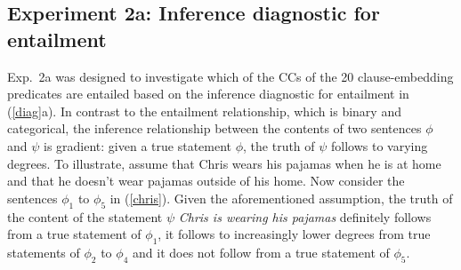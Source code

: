 \documentclass[11pt,fleqn]{article}
\newcommand{\6}{\mbox{$[\hspace*{-.6mm}[$}}
\newcommand{\9}{\mbox{$]\hspace*{-.6mm}]$}}
\begin{document}
%
%
%
%

\subsection{Experiment 2a: Inference diagnostic for entailment}\label{s31}

Exp.~2a was designed to investigate which of the CCs of the 20 clause-embedding predicates are entailed based on the inference diagnostic for entailment in (\ref{diag}a). In contrast to the entailment relationship, which is binary and categorical, the inference relationship between the contents of two sentences $\phi$ and $\psi$ is gradient: given a true statement $\phi$, the truth of $\psi$ follows to varying degrees. To illustrate, assume that Chris wears his pajamas when he is at home and that he doesn't wear pajamas outside of his home. Now consider the sentences $\phi_1$ to $\phi_5$ in (\ref{chris}). Given the aforementioned assumption, the truth of the content of the statement $\psi$ {\em Chris is wearing his pajamas} definitely follows from a true statement of $\phi_1$, it follows to increasingly lower degrees from true statements of $\phi_2$ to $\phi_4$ and it does not follow from a true statement of $\phi_5$. 
\end{document}
